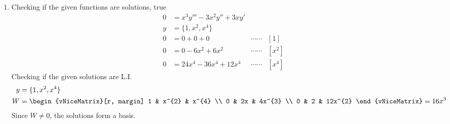 \begin{enumerate}
      \item Checking if the given functions are solutions, true
            \begin{align}
                  0 & = x^{3}y''' - 3x^{2}y'' + 3xy'                          \\
                  y & = \{1, x^{2}, x^{4}\}                                   \\
                  0 & = 0 + 0 + 0                    & \cdots\cdots & [1]     \\
                  0 & = 0 - 6x^{2} + 6x^{2}          & \cdots\cdots & [x^{2}] \\
                  0 & = 24x^{4} - 36x^{4} + 12x^{4}  & \cdots\cdots & [x^{4}]
            \end{align}
            Checking if the given solutions are L.I.
            \begin{align}
                  y & = \{1, x^{2}, x^{4}\}           \\
                  W & = \begin{vNiceMatrix}[r, margin]
                              1 & x^{2} & x^{4}   \\
                              0 & 2x    & 4x^{3}  \\
                              0 & 2     & 12x^{2}
                        \end{vNiceMatrix} = 16 x^{3}
            \end{align}
            Since $ W \neq 0 $, the solutions form a basis.


\end{enumerate}
